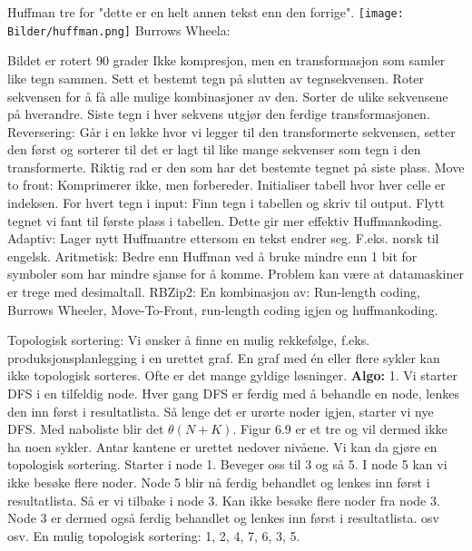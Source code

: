 \documentclass[10pt,a4paper]{article}
\begin{document}
\begin{multicols}{4}
{Huffman tre for "dette er en helt annen tekst enn den forrige".
\texttt{[image: Bilder/huffman.png]}
\color{orange}Burrows Wheela: \color{black}
\begin{figure}[H]
\end{figure}
Bildet er rotert 90 grader
Ikke kompresjon, men en transformasjon som samler like tegn sammen. Sett et bestemt tegn på slutten av tegnsekvensen. Roter sekvensen for å få alle mulige kombinasjoner av den. Sorter de ulike sekvensene på hverandre. Siste tegn i hver sekvens utgjør den ferdige transformasjonen. Reversering: Går i en løkke hvor vi legger til den transformerte sekvensen, setter den først og sorterer til det er lagt til like mange sekvenser som tegn i den transformerte. Riktig rad er den som har det bestemte tegnet på siste plass.
\color{orange}Move to front: \color{black}
Komprimerer ikke, men forbereder. Initialiser tabell hvor hver celle er indeksen. For hvert tegn i input: Finn tegn i tabellen og skriv til output. Flytt tegnet vi fant til første plass i tabellen. Dette gir mer effektiv Huffmankoding.
\color{orange}Adaptiv: \color{black}
Lager nytt Huffmantre ettersom en tekst endrer seg. F.eks. norsk til engelsk.
\color{orange}Aritmetisk: \color{black}
Bedre enn Huffman ved å bruke mindre enn 1 bit for symboler som har mindre sjanse for å komme. Problem kan være at datamaskiner er trege med desimaltall.
\color{orange}RBZip2: \color{black}
En kombinasjon av: Run-length coding, Burrows Wheeler, Move-To-Front, run-length coding igjen og huffmankoding.

\noindent
\color{red}Topologisk sortering:\color{black}
\noindent
Vi ønsker å finne en mulig rekkefølge, f.eks.
produksjonsplanlegging i en urettet graf. En graf med én eller flere sykler kan ikke topologisk sorteres. Ofte er det mange gyldige løsninger. \textbf{Algo:} 1. Vi starter DFS i en tilfeldig node. Hver gang DFS er ferdig med å behandle en node, lenkes den inn først i resultatlista. Så lenge det er urørte noder igjen, starter vi nye DFS. Med naboliste blir det $\theta(N + K)$. Figur 6.9 er et tre og vil dermed ikke ha noen sykler. Antar kantene er urettet nedover nivåene. Vi kan da gjøre en topologisk sortering. Starter i node 1. Beveger oss til 3 og så 5. I node 5 kan vi ikke besøke flere noder. Node 5 blir nå ferdig behandlet og lenkes inn først i resultatlista. Så er vi tilbake i node 3. Kan ikke besøke flere noder fra node 3. Node 3 er dermed også ferdig behandlet og lenkes inn først i resultatlista. osv osv. En mulig topologisk sortering: 1, 2, 4, 7, 6, 3, 5.
\noindent

}
\end{multicols}
\end{document}
